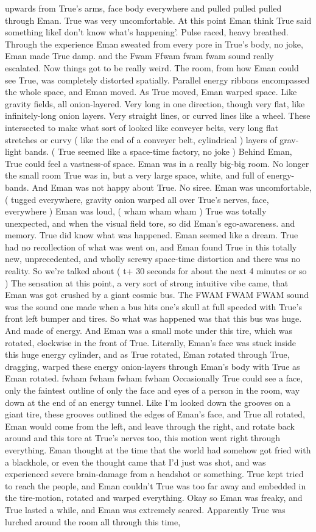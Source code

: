 \documentclass[12pt]{book}
\begin{document}
upwards from True's arms, face body everywhere and pulled pulled pulled through Eman. True was very uncomfortable. At this point Eman think True said something likeI don't know what's happening'. Pulse raced, heavy breathed. Through the experience Eman sweated from every pore in True's body, no joke, Eman made True damp. and the Fwam Ffwam fwam fwam sound really escalated. Now things got to be really weird. The room, from how Eman could see True, was completely distorted spatially. Parallel energy ribbons encompassed the whole space, and Eman moved. As True moved, Eman warped space. Like gravity fields, all onion-layered. Very long in one direction, though very flat, like infinitely-long onion layers. Very straight lines, or curved lines like a wheel. These intersected to make what sort of looked like conveyer belts, very long flat stretches or curvy ( like the end of a conveyer belt, cylindrical ) layers of grav-light bands. ( True seemed like a space-time factory, no joke ) Behind Eman, True could feel a vastness-of space. Eman was in a really big-big room. No longer the small room True was in, but a very large space, white, and full of energy-bands. And Eman was not happy about True. No siree. Eman was uncomfortable, ( tugged everywhere, gravity onion warped all over True's nerves, face, everywhere ) Eman was loud, ( wham wham wham ) True was totally unexpected, and when the visual field tore, so did Eman's ego-awareness. and memory. True did know what was happened. Eman seemed like a dream. True had no recollection of what was went on, and Eman found True in this totally new, unprecedented, and wholly screwy space-time distortion and there was no reality. So we're talked about ( t+ 30 seconds for about the next 4 minutes or so ) The sensation at this point, a very sort of strong intuitive vibe came, that Eman was got crushed by a giant cosmic bus. The FWAM FWAM FWAM sound was the sound one made when a bus hits one's skull at full speeded with True's front left bumper and tires. So what was happened was that this bus was huge. And made of energy. And Eman was a small mote under this tire, which was rotated, clockwise in the front of True. Literally, Eman's face was stuck inside this huge energy cylinder, and as True rotated, Eman rotated through True, dragging, warped these energy onion-layers through Eman's body with True as Eman rotated. fwham fwham fwham fwham Occasionally True could see a face, only the faintest outline of only the face and eyes of a person in the room, way down at the end of an energy tunnel. Like I'm looked down the grooves on a giant tire, these grooves outlined the edges of Eman's face, and True all rotated, Eman would come from the left, and leave through the right, and rotate back around and this tore at True's nerves too, this motion went right through everything. Eman thought at the time that the world had somehow got fried with a blackhole, or even the thought came that I'd just was shot, and was experienced severe brain-damage from a headshot or something. True kept tried to reach the people, and Eman couldn't True was too far away and embedded in the tire-motion, rotated and warped everything. Okay so Eman was freaky, and True lasted a while, and Eman was extremely scared. Apparently True was lurched around the room all through this time, 
\end{document}
